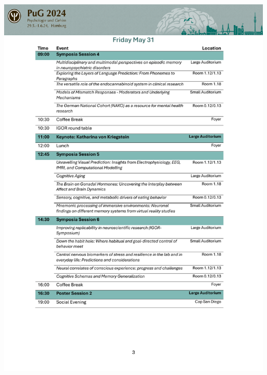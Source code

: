     \begin{center}
		\includegraphics[width=1\textwidth]{tex/images/programme_overview/Fri.pdf}
	\end{center}
		
	\newpage

